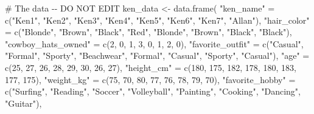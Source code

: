 \documentclass[
  letterpaper,
  DIV=11,
  numbers=noendperiod]{scrreprt}
\newenvironment{Shaded}{\begin{snugshade}}{\end{snugshade}}
\newcommand{\CommentTok}[1]{\textcolor[rgb]{0.37,0.37,0.37}{#1}}
\newcommand{\DecValTok}[1]{\textcolor[rgb]{0.68,0.00,0.00}{#1}}
\newcommand{\FunctionTok}[1]{\textcolor[rgb]{0.28,0.35,0.67}{#1}}
\newcommand{\NormalTok}[1]{\textcolor[rgb]{0.00,0.23,0.31}{#1}}
\newcommand{\OtherTok}[1]{\textcolor[rgb]{0.00,0.23,0.31}{#1}}
\newcommand{\StringTok}[1]{\textcolor[rgb]{0.13,0.47,0.30}{#1}}
\begin{document}
\begin{Shaded}
\begin{Highlighting}[]
\CommentTok{\# The data {-}{-} DO NOT EDIT }
\NormalTok{ken\_data }\OtherTok{\textless{}{-}} \FunctionTok{data.frame}\NormalTok{(}
  \StringTok{"ken\_name"} \OtherTok{=} \FunctionTok{c}\NormalTok{(}\StringTok{"Ken1"}\NormalTok{, }\StringTok{"Ken2"}\NormalTok{, }\StringTok{"Ken3"}\NormalTok{, }\StringTok{"Ken4"}\NormalTok{, }\StringTok{"Ken5"}\NormalTok{, }\StringTok{"Ken6"}\NormalTok{, }\StringTok{"Ken7"}\NormalTok{, }\StringTok{"Allan"}\NormalTok{),}
  \StringTok{"hair\_color"} \OtherTok{=} \FunctionTok{c}\NormalTok{(}\StringTok{"Blonde"}\NormalTok{, }\StringTok{"Brown"}\NormalTok{, }\StringTok{"Black"}\NormalTok{, }\StringTok{"Red"}\NormalTok{, }\StringTok{"Blonde"}\NormalTok{, }\StringTok{"Brown"}\NormalTok{, }\StringTok{"Black"}\NormalTok{, }\StringTok{"Black"}\NormalTok{),}
  \StringTok{"cowboy\_hats\_owned"} \OtherTok{=} \FunctionTok{c}\NormalTok{(}\DecValTok{2}\NormalTok{, }\DecValTok{0}\NormalTok{, }\DecValTok{1}\NormalTok{, }\DecValTok{3}\NormalTok{, }\DecValTok{0}\NormalTok{, }\DecValTok{1}\NormalTok{, }\DecValTok{2}\NormalTok{, }\DecValTok{0}\NormalTok{),}
  \StringTok{"favorite\_outfit"} \OtherTok{=} \FunctionTok{c}\NormalTok{(}\StringTok{"Casual"}\NormalTok{, }\StringTok{"Formal"}\NormalTok{, }\StringTok{"Sporty"}\NormalTok{, }\StringTok{"Beachwear"}\NormalTok{, }\StringTok{"Formal"}\NormalTok{, }\StringTok{"Casual"}\NormalTok{, }\StringTok{"Sporty"}\NormalTok{, }\StringTok{"Casual"}\NormalTok{),}
  \StringTok{"age"} \OtherTok{=} \FunctionTok{c}\NormalTok{(}\DecValTok{25}\NormalTok{, }\DecValTok{27}\NormalTok{, }\DecValTok{26}\NormalTok{, }\DecValTok{28}\NormalTok{, }\DecValTok{29}\NormalTok{, }\DecValTok{30}\NormalTok{, }\DecValTok{26}\NormalTok{, }\DecValTok{27}\NormalTok{),}
  \StringTok{"height\_cm"} \OtherTok{=} \FunctionTok{c}\NormalTok{(}\DecValTok{180}\NormalTok{, }\DecValTok{175}\NormalTok{, }\DecValTok{182}\NormalTok{, }\DecValTok{178}\NormalTok{, }\DecValTok{180}\NormalTok{, }\DecValTok{183}\NormalTok{, }\DecValTok{177}\NormalTok{, }\DecValTok{175}\NormalTok{),}
  \StringTok{"weight\_kg"} \OtherTok{=} \FunctionTok{c}\NormalTok{(}\DecValTok{75}\NormalTok{, }\DecValTok{70}\NormalTok{, }\DecValTok{80}\NormalTok{, }\DecValTok{77}\NormalTok{, }\DecValTok{76}\NormalTok{, }\DecValTok{78}\NormalTok{, }\DecValTok{79}\NormalTok{, }\DecValTok{70}\NormalTok{),}
  \StringTok{"favorite\_hobby"} \OtherTok{=} \FunctionTok{c}\NormalTok{(}\StringTok{"Surfing"}\NormalTok{, }\StringTok{"Reading"}\NormalTok{, }\StringTok{"Soccer"}\NormalTok{, }\StringTok{"Volleyball"}\NormalTok{, }\StringTok{"Painting"}\NormalTok{, }\StringTok{"Cooking"}\NormalTok{, }\StringTok{"Dancing"}\NormalTok{, }\StringTok{"Guitar"}\NormalTok{),}

\end{Highlighting}
\end{Shaded}
\end{document}
